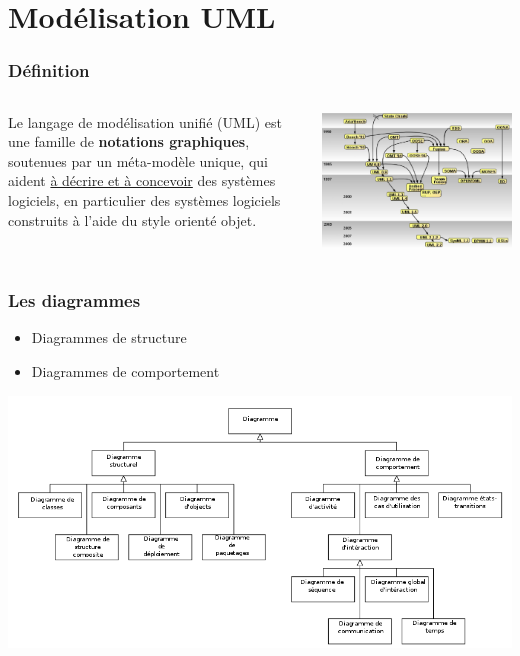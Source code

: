 \section{Modélisation UML}
\label{sec:uml}

\begin{frame}
    \frametitle{Définition}
    \begin{columns}
        \begin{column}{0.5\textwidth}
            Le langage de modélisation unifié (UML) est une famille de \textbf{notations graphiques},
            soutenues par un méta-modèle unique,
            qui aident \underline{à décrire et à concevoir} des systèmes logiciels,
            en particulier des systèmes logiciels construits à l'aide du style orienté objet.
        \end{column}
        \begin{column}{0.5\textwidth}
            \centering
            \includegraphics[width=\linewidth]{figures/uml/uml-historie}
        \end{column}
    \end{columns}
\end{frame}

\begin{frame}
    \frametitle{Les diagrammes}
    \begin{itemize}
        \item Diagrammes de structure
        \item Diagrammes de comportement
    \end{itemize}
    \centering
    \includegraphics[height=0.4\linewidth]{figures/uml/uml-diagrammes}
\end{frame}


